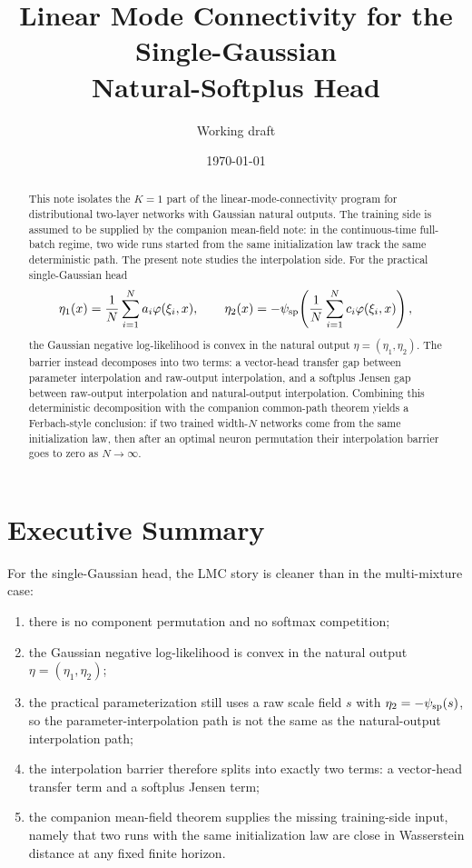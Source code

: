 \documentclass[11pt]{article}
\title{Linear Mode Connectivity for the Single-Gaussian\\Natural-Softplus Head}
\author{Working draft}
\date{\today}
\theoremstyle{definition}
\begin{document}
\maketitle

\begin{abstract}
This note isolates the $K=1$ part of the linear-mode-connectivity program for
distributional two-layer networks with Gaussian natural outputs. The training
side is assumed to be supplied by the companion mean-field note: in the
continuous-time full-batch regime, two wide runs started from the same
initialization law track the same deterministic path. The present note studies
the interpolation side. For the practical single-Gaussian head
\[
  \eta_1(x)=\frac1N\sum_{i=1}^N a_i\varphi(\xi_i,x),
  \qquad
  \eta_2(x)=-\psi_{\rm sp}\!\left(\frac1N\sum_{i=1}^N c_i\varphi(\xi_i,x)\right),
\]
the Gaussian negative log-likelihood is convex in the natural output
$\eta=(\eta_1,\eta_2)$. The barrier
instead decomposes into two terms: a vector-head transfer gap between parameter
interpolation and raw-output interpolation, and a softplus Jensen gap between
raw-output interpolation and natural-output interpolation. Combining this
deterministic decomposition with the companion common-path theorem yields a
Ferbach-style conclusion: if two trained width-$N$ networks come from the same
initialization law, then after an optimal neuron permutation their
interpolation barrier goes to zero as $N\to\infty$.
\end{abstract}

\section{Executive Summary}

For the single-Gaussian head, the LMC story is cleaner than in the multi-mixture
case:
\begin{enumerate}[label=(\roman*)]
  \item there is no component permutation and no softmax competition;
  \item the Gaussian negative log-likelihood is convex in the natural output
  $\eta=(\eta_1,\eta_2)$;
  \item the practical parameterization still uses a raw scale field
  $s$ with $\eta_2=-\psi_{\rm sp}(s)$, so the parameter-interpolation path is
  not the same as the natural-output interpolation path;
  \item the interpolation barrier therefore splits into exactly two terms:
  a vector-head transfer term and a softplus Jensen term;
  \item the companion mean-field theorem supplies the missing training-side
  input, namely that two runs with the same initialization law are close in
  Wasserstein distance at any fixed finite horizon.
\end{enumerate}
\end{document}
